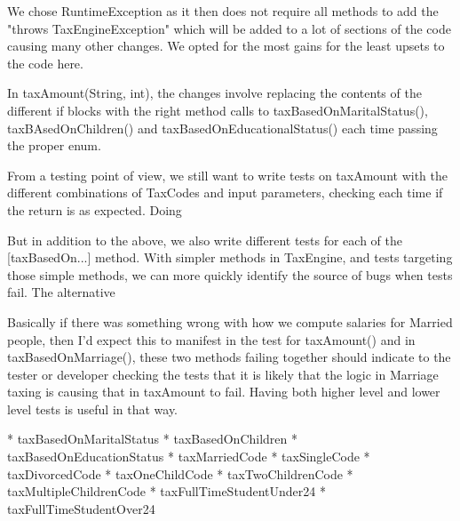 \documentclass[11pt]{article}
\begin{document}
We chose RuntimeException as it then does not require all methods to add the "throws TaxEngineException" which will be added to a lot of sections of the code causing many other changes. We opted for the most gains for the least upsets to the code here. 


In taxAmount(String, int), the changes involve replacing the contents of the different if blocks with the right method calls to taxBasedOnMaritalStatus(), taxBAsedOnChildren() and taxBasedOnEducationalStatus() each time passing the proper enum. 

From a testing point of view, we still want to write tests on taxAmount with the different combinations of TaxCodes and input parameters, checking each time if the return is as expected. Doing  

But in addition to the above, we also write different tests for each of the [taxBasedOn...] method. With simpler methods in TaxEngine, and tests targeting those simple methods, we can more quickly identify the source of bugs when tests fail. The alternative 

Basically if there was something wrong with how we compute salaries for Married people, then I'd expect this to manifest in the test for taxAmount() and
in taxBasedOnMarriage(), these two methods failing together should indicate to the tester or developer checking the tests that it is likely that the logic
in Marriage taxing is causing that in taxAmount to fail. Having both higher level and lower level tests is useful in that way. 

* taxBasedOnMaritalStatus
* taxBasedOnChildren
* taxBasedOnEducationStatus  
* taxMarriedCode
* taxSingleCode
* taxDivorcedCode
* taxOneChildCode
* taxTwoChildrenCode
* taxMultipleChildrenCode
* taxFullTimeStudentUnder24
* taxFullTimeStudentOver24
\end{document}
